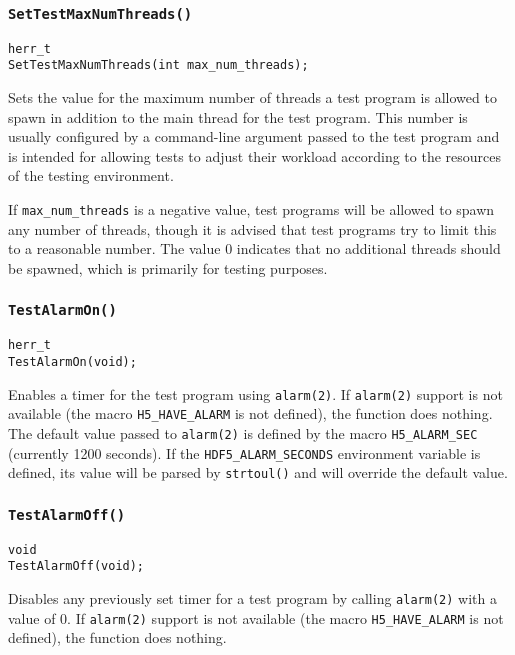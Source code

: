 \documentclass[../HDF5_RFC.tex]{subfiles}
\begin{document}
\subsubsection{\texttt{SetTestMaxNumThreads()}}

\begin{verbatim}
herr_t
SetTestMaxNumThreads(int max_num_threads);
\end{verbatim}

Sets the value for the maximum number of threads a test program is allowed to spawn in addition to the
main thread for the test program. This number is usually configured by a command-line argument passed to
the test program and is intended for allowing tests to adjust their workload according to the resources
of the testing environment.

If \texttt{max\_num\_threads} is a negative value, test programs will be allowed to spawn any number of
threads, though it is advised that test programs try to limit this to a reasonable number. The value 0
indicates that no additional threads should be spawned, which is primarily for testing purposes.

\subsubsection{\texttt{TestAlarmOn()}}
\label{apdx:testframe_testalarmon}

\begin{verbatim}
herr_t
TestAlarmOn(void);
\end{verbatim}

Enables a timer for the test program using \texttt{alarm(2)}. If \texttt{alarm(2)} support is not available
(the macro \texttt{H5\_HAVE\_ALARM} is not defined), the function does nothing. The default value passed to \texttt{alarm(2)} is defined by the macro \texttt{H5\_ALARM\_SEC} (currently 1200 seconds). If the
\texttt{HDF5\_ALARM\_SECONDS} environment variable is defined, its value will be parsed by
\texttt{strtoul()} and will override the default value.

\subsubsection{\texttt{TestAlarmOff()}}
\label{apdx:testframe_testalarmoff}

\begin{verbatim}
void
TestAlarmOff(void);
\end{verbatim}

Disables any previously set timer for a test program by calling \texttt{alarm(2)} with a value of 0. If
\texttt{alarm(2)} support is not available (the macro \texttt{H5\_HAVE\_ALARM} is not defined), the
function does nothing.
\end{document}
